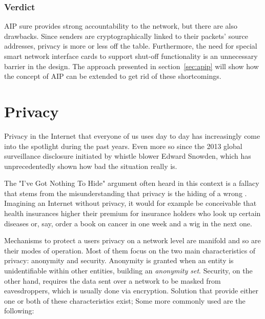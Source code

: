 \documentclass{acm_proc_article-sp}
\begin{document}
\subsubsection{Verdict}
AIP sure provides strong accountability to the network, but there are also drawbacks. Since senders are cryptographically linked to their packets' source addresses, privacy is more or less off the table. Furthermore, the need for special smart network interface cards to support shut-off functionality is an unnecessary barrier in the design. The approach presented in section~\ref{sec:apip} will show how the concept of AIP can be extended to get rid of these shortcomings.


\section{Privacy}
\label{sec:priv}
Privacy in the Internet that everyone of us uses day to day has increasingly come into the spotlight during the past years. Even more so since the 2013 global surveillance disclosure initiated by whistle blower Edward Snowden, which has unprecedentedly shown how bad the situation really is.

The "I've Got Nothing To Hide" argument often heard in this context is a fallacy that stems from the misunderstanding that privacy is the hiding of a wrong \cite{solove}. Imagining an Internet without privacy, it would for example be conceivable that health insurances higher their premium for insurance holders who look up certain diseases or, say, order a book on cancer in one week and a wig in the next one.

Mechanisms to protect a users privacy on a network level are manifold and so are their modes of operation. Most of them focus on the two main characteristics of privacy: anonymity and security. Anonymity is granted when an entity is unidentifiable within other entities, building an \emph{anonymity set}. Security, on the other hand, requires the data sent over a network to be masked from eavesdroppers, which is usually done via encryption. Solution that provide either one or both of these characteristics exist; Some more commonly used are the following:
\end{document}

